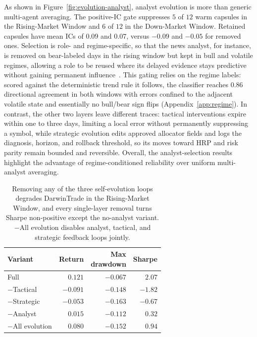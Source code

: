 \documentclass[letterpaper]{article}
\begin{document}
As shown in Figure~\ref{fig:evolution-analyst}, analyst evolution is more
than generic multi-agent averaging. The positive-IC gate suppresses $5$ of
$12$ warm capsules in the Rising-Market Window and $6$ of $12$ in the
Down-Market Window. Retained capsules have mean ICs of $0.09$ and $0.07$,
versus $-0.09$ and $-0.05$ for removed ones. Selection is role- and
regime-specific, so that the news analyst, for instance, is removed on
bear-labeled days in the rising window but kept in bull and volatile
regimes, allowing a role to be reused where its delayed evidence stays
predictive without gaining permanent
influence~\citep{zhang2025regimefolio,jeon2026blindtrade}. This gating relies
on the regime labels: scored against the deterministic trend rule it
follows, the classifier reaches $0.86$ directional agreement in both windows
with errors confined to the adjacent volatile state and essentially
no bull/bear sign flips (Appendix~\ref{app:regime}). In contrast, the other
two layers leave different traces: tactical interventions expire within one
to three days, limiting a local error without permanently suppressing a
symbol, while strategic evolution edits approved allocator fields and logs
the diagnosis, horizon, and rollback threshold, so its moves toward HRP and
risk parity remain bounded and reversible. Overall, the analyst-selection
results highlight the advantage of regime-conditioned reliability over
uniform multi-analyst averaging.

\begin{table}[t]
\centering
\footnotesize
\setlength{\tabcolsep}{5pt}
\begin{tabular}{@{}l r r r@{}}
\toprule
Variant & Return & \shortstack[r]{Max\\drawdown} & Sharpe \\
\midrule
Full            & $\mathbf{0.121}$ & $\mathbf{-0.067}$ & $\mathbf{2.07}$ \\
$-$Tactical     & $-0.091$ & $-0.148$ & $-1.82$ \\
$-$Strategic    & $-0.053$ & $-0.163$ & $-0.67$ \\
$-$Analyst      & $\phantom{-}0.015$ & $-0.112$ & $\phantom{-}0.32$ \\
$-$All evolution & $\phantom{-}0.080$ & $-0.152$ & $\phantom{-}0.94$ \\
\bottomrule
\end{tabular}
\caption{Removing any of the three self-evolution loops degrades DarwinTrade
in the Rising-Market Window, and every single-layer removal turns Sharpe
non-positive except the no-analyst variant. $-$All evolution disables
analyst, tactical, and strategic feedback loops jointly.}
\label{tab:darwin}
\end{table}
\end{document}
